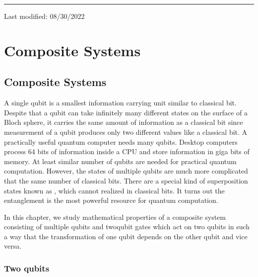 \documentclass[letterpaper,10pt,english]{jupyterBook}
\begin{document}
\bigskip\hrule\bigskip


\sphinxAtStartPar
Last modified: 08/30/2022

\sphinxstepscope


\part{Composite Systems}

\sphinxstepscope


\chapter{Composite Systems}
\label{\detokenize{composites/intro:composite-systems}}\label{\detokenize{composites/intro:ch-composites}}\label{\detokenize{composites/intro::doc}}
\sphinxAtStartPar
A single qubit is a smallest information carrying unit similar to classical bit.  Despite that a qubit can take infinitely many different states on the surface of a Bloch sphere, it carries the same amount of information as a classical bit since measurement of a qubit produces only two different values like a classical bit.  A practically useful quantum computer needs many qubits. Desktop computers process 64 bits of information inside a CPU and store information in giga bits of memory. At least similar number of qubits are needed for practical quantum computation.  However, the states of multiple qubits are much more complicated that the same number of classical bits. There are a special kind of superposition states known as , which cannot realized in classical bits.  It turns out the entanglement is the most powerful resource for quantum computation.

\sphinxAtStartPar
In this chapter, we study mathematical properties of a composite system consisting of multiple qubits and two\sphinxhyphen{}qubit gates which act on two qubits in such a way that the transformation of one qubit  depends on the other qubit and vice versa.

\sphinxstepscope


\section{Two qubits}
\label{\detokenize{composites/2qubit:two-qubits}}\label{\detokenize{composites/2qubit:sec-2qubits}}\label{\detokenize{composites/2qubit::doc}}
\end{document}
